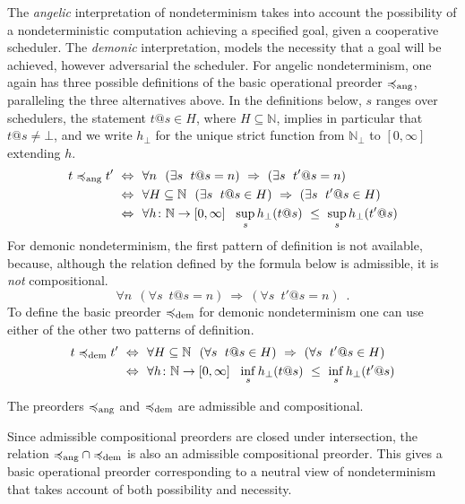 The  \emph{angelic} interpretation of nondeterminism takes into account the possibility of a nondeterministic computation achieving a specified goal, given a cooperative scheduler.  The  \emph{demonic} interpretation, 
models the {necessity} that a goal will be achieved, however adversarial the scheduler. 
For angelic nondeterminism, one again has three possible definitions of the basic operational preorder
$\preccurlyeq_{\text{ang}}$, paralleling the three alternatives above. In the definitions below, $s$ ranges over schedulers, the statement $t@s \in H$, where $H \subseteq \mathbb{N}$, implies in particular that $t@s \neq\bot$, and we write $h_\bot$ for the unique strict function from $\mathbb{N}_\bot$ to
$[0,\infty]$ extending $h$.
\begin{align*}
t \preccurlyeq_{\text{ang}} t' ~ \Leftrightarrow ~ ~& \forall n ~~ (\exists s ~\; t@s =n)~ \Rightarrow~ (\exists s ~ \; t'@s =n) 
\\
~ \Leftrightarrow ~ ~& \forall H \subseteq \mathbb{N}~~ (\exists s ~\; t@s \in H)~ \Rightarrow~ (\exists s ~ \; t'@s \in H) 
\\
~ \Leftrightarrow ~ ~& \forall h\colon \mathbb{N}\to [0,\infty]~~ \sup_s h_\bot(t@s)~ \leq ~ \sup_s h_\bot(t'@s)
\end{align*}
For demonic nondeterminism, the first pattern of definition is not available, because, although  the relation defined by the formula below is admissible, it is  \emph{not} compositional.
\[
\forall n ~~ (\forall s ~\; t@s =n)~ \Rightarrow~ (\forall s ~ \; t'@s =n) \enspace .
\]
To define the basic preorder $\preccurlyeq_{\text{dem}}$ for demonic nondeterminism one can use either of the other two patterns of definition.
\begin{align*}
t \preccurlyeq_{\text{dem}} t' ~ \Leftrightarrow ~ ~& \forall H \subseteq \mathbb{N}~~ (\forall s ~ \; t@s \in H)~ \Rightarrow~ (\forall s ~ \; t'@s \in H) 
\\
~ \Leftrightarrow ~ ~& \forall h\colon \mathbb{N}\to [0,\infty]~~ \inf_s  h_\bot(t@s)~ \leq ~ \inf_s h_\bot(t'@s)
\end{align*}
\begin{proposition}
The preorders $\preccurlyeq_{\text{ang}}$  and $\preccurlyeq_{\text{dem}}$ are admissible and compositional. 
\end{proposition}
\noindent
Since admissible compositional preorders are closed under intersection, the relation ${\preccurlyeq_{\text{ang}}} \cap {\preccurlyeq_{\text{dem}}}$ is also an admissible compositional preorder. This gives a basic operational preorder corresponding to a neutral view of nondeterminism that takes account of both possibility and necessity.

